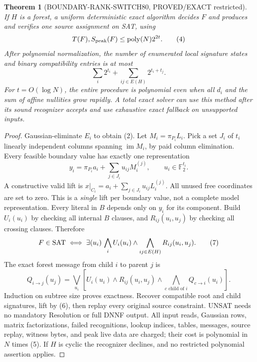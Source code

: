 \documentclass[11pt]{article}
\newtheorem{theorem}{Theorem}
\begin{document}
\begin{theorem}[BOUNDARY-RANK-SWITCH80, PROVED/EXACT restricted]
If $H$ is a forest, a uniform deterministic exact algorithm decides
$F$ and produces and verifies one source assignment on SAT, using
\[
T(F),S_{\rm peak}(F)\le\operatorname{poly}(N)2^{2t}. \tag{4}
\]
After polynomial normalization, the number of enumerated local
signature states and binary compatibility entries is at most
\[
\sum_i2^{t_i}+\sum_{ij\in E(H)}2^{t_i+t_j}. \tag{5}
\]
For $t=O(\log N)$, the entire procedure is polynomial even when all
$d_i$ and the sum of affine nullities grow rapidly.
A total exact solver can use this method after its sound recognizer
accepts and use exhaustive exact fallback on unsupported inputs.
\end{theorem}
\begin{proof}
Gaussian-eliminate $E_i$ to obtain (2). Let
$M_i=\pi_{P_i}L_i$. Pick a set $J_i$ of $t_i$ linearly
independent columns spanning $\operatorname{im}M_i$, by paid
column elimination. Every feasible boundary value has exactly
one representation
\[
y_i=\pi_{P_i}a_i+\sum_{j\in J_i}u_{ij}M_i^{(j)},
\qquad u_i\in\mathbb F_2^{t_i}. \tag{6}
\]
A constructive valid lift is
$x|_{C_i}=a_i+\sum_{j\in J_i}u_{ij}L_i^{(j)}$.
All unused free coordinates are set to zero. This is a \emph{single}
lift per boundary value, not a complete model representation.
Every literal in $B$ depends only on $y_i$ for its component.
Build $U_i(u_i)$ by checking all internal $B$ clauses, and
$R_{ij}(u_i,u_j)$ by checking all crossing clauses. Therefore
\[
F\in{\rm SAT}\iff\exists(u_i)\,
\bigwedge_i U_i(u_i)\wedge
\bigwedge_{ij\in E(H)}R_{ij}(u_i,u_j). \tag{7}
\]
The exact forest message from child $i$ to parent $j$ is
\[
Q_{i\to j}(u_j)=\bigvee_{u_i}
[U_i(u_i)\wedge R_{ij}(u_i,u_j)\wedge
\bigwedge_{c\text{ child of }i}Q_{c\to i}(u_i)]. \tag{8}
\]
Induction on subtree size proves exactness. Recover compatible
root and child signatures, lift by (6), then replay every
original source constraint. UNSAT needs no mandatory Resolution
or full DNNF output. All input reads, Gaussian rows, matrix
factorizations, failed recognitions, lookup indices, tables, messages,
source replay, witness bytes, and peak live data are charged;
their cost is polynomial in $N$ times (5). If $H$ is cyclic
the recognizer declines, and no restricted polynomial assertion applies.
\end{proof}
\end{document}

